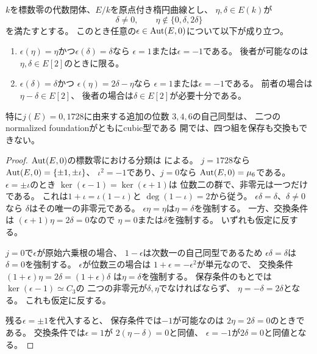 \begin{lemma}
\label{lem:qa-ou-cm-no-extra-two-cubic-automorphisms}
$k$を標数零の代数閉体、$E/k$を原点付き楕円曲線とし、
$\eta,\delta\in E(k)$が
\[
 \delta\ne0,\qquad
 \eta\notin\{0,\delta,2\delta\}
 \tag{CM-open}\label{eq:qa-ou-cm-two-cubic-open}
\]
を満たすとする。
このとき任意の$\epsilon\in\operatorname{Aut}(E,0)$について以下が成り立つ。
\begin{enumerate}
\item $\epsilon(\eta)=\eta$かつ$\epsilon(\delta)=\delta$なら
$\epsilon=1$または$\epsilon=-1$である。
後者が可能なのは$\eta,\delta\in E[2]$のときに限る。
\item $\epsilon(\delta)=\delta$かつ
$\epsilon(\eta)=2\delta-\eta$なら
$\epsilon=1$または$\epsilon=-1$である。
前者の場合は$\eta-\delta\in E[2]$、
後者の場合は$\delta\in E[2]$が必要十分である。
\end{enumerate}
特に$j(E)=0,1728$に由来する追加の位数
$3,4,6$の自己同型は、
二つのnormalized foundationがともにcubic型である
開では、四つ組を保存も交換もできない。
\end{lemma}
\begin{proof}
$\operatorname{Aut}(E,0)$の標数零における分類は
\cite[Chapter III, Theorem 10.1]{SilvermanAEC1986}による。
$j=1728$なら$\operatorname{Aut}(E,0)=\{\pm1,\pm\iota\}$、
$\iota^2=-1$であり、$j=0$なら
$\operatorname{Aut}(E,0)=\mu_6$である。
$\epsilon=\pm\iota$のとき
$\ker(\epsilon-1)=\ker(\epsilon+1)$は
位数二の群で、非零元は一つだけである。
これは$1+\iota=\iota(1-\iota)$と
$\deg(1-\iota)=2$から従う。
$\epsilon\delta=\delta$、$\delta\ne0$なら
$\delta$はその唯一の非零元である。
$\epsilon\eta=\eta$は$\eta=\delta$を強制する。
一方、交換条件は
$(\epsilon+1)\eta=2\delta=0$なので
$\eta=0$または$\delta$を強制する。
いずれも仮定に反する。

$j=0$で$\epsilon$が原始六乗根の場合、
$1-\epsilon$は次数一の自己同型であるため
$\epsilon\delta=\delta$は$\delta=0$を強制する。
$\epsilon$が位数三の場合は
$1+\epsilon=-\epsilon^2$が単元なので、
交換条件
$(1+\epsilon)\eta=2\delta=(1+\epsilon)\delta$
は$\eta=\delta$を強制する。
保存条件のもとでは
$\ker(\epsilon-1)\simeq C_3$の
二つの非零元が$\delta,\eta$でなければならず、
$\eta=-\delta=2\delta$となる。
これも仮定に反する。

残る$\epsilon=\pm1$を代入すると、
保存条件では$-1$が可能なのは
$2\eta=2\delta=0$のときである。
交換条件では$\epsilon=1$が
$2(\eta-\delta)=0$と同値、
$\epsilon=-1$が$2\delta=0$と同値となる。
\end{proof}

